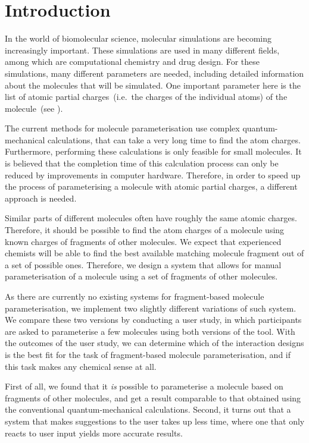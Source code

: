\chapter{Introduction}

In the world of biomolecular science, molecular simulations are becoming increasingly important. These simulations are used in many different fields, among which are computational chemistry and drug design. For these simulations, many different parameters are needed, including detailed information about the molecules that will be simulated. One important parameter here is the list of atomic partial charges~(i.e.\ the charges of the individual atoms) of the molecule~(see ).

The current methods for molecule parameterisation use complex quantum-mechanical calculations, that can take a very long time to find the atom charges. Furthermore, performing these calculations is only feasible for small molecules. It is believed that the completion time of this calculation process can only be reduced by improvements in computer hardware. Therefore, in order to speed up the process of parameterising a molecule with atomic partial charges, a different approach is needed.

Similar parts of different molecules often have roughly the same atomic charges. Therefore, it should be possible to find the atom charges of a molecule using known charges of fragments of other molecules. We expect that experienced chemists will be able to find the best available matching molecule fragment out of a set of possible ones. Therefore, we design a system that allows for manual parameterisation of a molecule using a set of fragments of other molecules.

As there are currently no existing systems for fragment-based molecule parameterisation, we implement two slightly different variations of such system. We compare these two versions by conducting a user study, in which participants are asked to parameterise a few molecules using both versions of the tool. With the outcomes of the user study, we can determine which of the interaction designs is the best fit for the task of fragment-based molecule parameterisation, and if this task makes any chemical sense at all.

First of all, we found that it \emph{is} possible to parameterise a molecule based on fragments of other molecules, and get a result comparable to that obtained using the conventional quantum-mechanical calculations. Second, it turns out that a system that makes suggestions to the user takes up less time, where one that only reacts to user input yields more accurate results.


